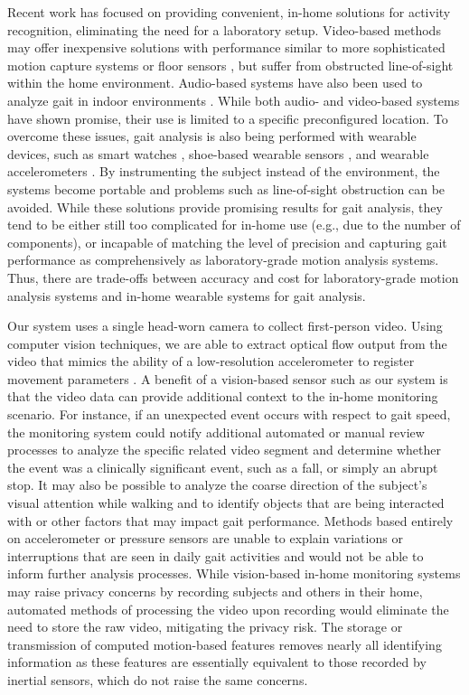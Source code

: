 \documentclass[12pt]{report}
\begin{document}
Recent work has focused on providing convenient, in-home solutions for activity recognition, eliminating the need for a laboratory setup. Video-based methods may offer inexpensive solutions with performance similar to more sophisticated motion capture systems or floor sensors \cite{Wang2013TowardAdults}, but suffer from obstructed line-of-sight within the home environment. Audio-based systems have also been used to analyze gait in indoor environments \cite{Geiger2013Gait-basedFeatures, Altaf2015AcousticSounds}. While both audio- and video-based systems have shown promise, their use is limited to a specific preconfigured location. To overcome these issues, gait analysis is also being performed with wearable devices, such as smart watches \cite{Suh2016Kalman-Filter-BasedSmart-Watch}, shoe-based wearable sensors \cite{Mariani2013On-shoeDisease}, and wearable accelerometers \cite{Fortune2014ValidityVelocities, Hartmann2009ConcurrentAdults, DelDin2016ValidationUse, Chung2012GaitAccelerometer}. By instrumenting the subject instead of the environment, the systems become portable and problems such as line-of-sight obstruction can be avoided. While these solutions provide promising results for gait analysis, they tend to be either still too complicated for in-home use (e.g., due to the number of components), or incapable of matching the level of precision and capturing gait performance as comprehensively as  laboratory-grade motion analysis systems. Thus, there are trade-offs between accuracy and cost for laboratory-grade motion analysis systems and in-home wearable systems for gait analysis.

Our system uses a single head-worn camera to collect first-person video. Using computer vision techniques, we are able to extract optical flow output from the video that mimics the ability of a low-resolution accelerometer to register movement parameters \cite{Schneider2017PreliminaryProcessing}. A benefit of a vision-based sensor such as our system is that the video data can provide additional context to the in-home monitoring scenario. For instance, if an unexpected event occurs with respect to gait speed, the monitoring system could notify additional automated or manual review processes to analyze the specific related video segment and determine whether the event was a clinically significant event, such as a fall, or simply an abrupt stop. It may also be possible to analyze the coarse direction of the subject's visual attention while walking and to identify objects that are being interacted with or other factors that may impact gait performance. Methods based entirely on accelerometer or pressure sensors are unable to explain variations or interruptions that are seen in daily gait activities and would not be able to inform further analysis processes. While vision-based in-home monitoring systems may raise privacy concerns by recording subjects and others in their home, automated methods of processing the video upon recording would eliminate the need to store the raw video, mitigating the privacy risk. The storage or transmission of computed motion-based features removes nearly all identifying information as these features are essentially equivalent to those recorded by inertial sensors, which do not raise the same concerns.
\end{document}
